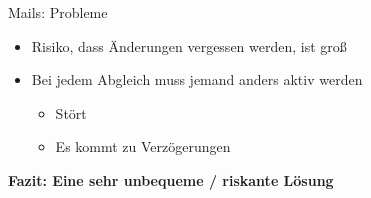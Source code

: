\begin{frame}{Mails: Probleme}
  \centering
  \begin{itemize}
    \item Risiko, dass Änderungen vergessen werden, ist groß
    \item Bei jedem Abgleich muss jemand anders aktiv werden
      \begin{itemize}
        \item Stört
        \item Es kommt zu Verzögerungen
      \end{itemize}
  \end{itemize}
  \textbf{\Large Fazit: Eine sehr unbequeme / riskante Lösung}
\end{frame}


